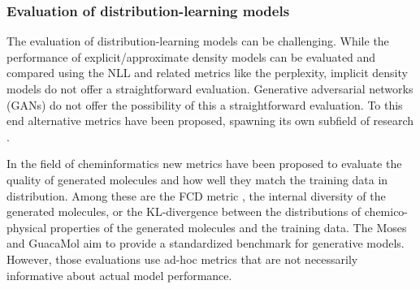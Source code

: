 

\subsubsection{Evaluation of distribution-learning models}
The evaluation of distribution-learning models can be challenging.
While the performance of explicit/approximate density models can be evaluated 
and compared using the \ac{NLL} and related metrics like the perplexity,
implicit density models do not offer a straightforward evaluation.
Generative adversarial networks (GANs) \citep{goodfellowGenerativeAdversarialNetworks2014}
do not offer the possibility of this a straightforward evaluation. To this end
alternative metrics have been proposed, spawning its own subfield of research
\citep{heuselGANsTrainedTwo2017}.

In the field of cheminformatics new metrics have been proposed to evaluate the
quality of generated molecules and how well they match the training data in
distribution.
Among these are the FCD metric
\citep{preuerFrechetChemNetDistance2018}, the internal diversity
\citep{benhendaChemGANChallengeDrug2017} of the generated molecules, or the
KL-divergence between the distributions of chemico-physical properties of the
generated molecules and the training data.
The Moses \citet{polykovskiyMolecularSetsMOSES2020} and GuacaMol
\citet{brownGuacaMolBenchmarkingModels2019} aim to provide a standardized
benchmark for generative models. However, those evaluations 
use ad-hoc metrics that are not necessarily informative about actual model 
performance. 

